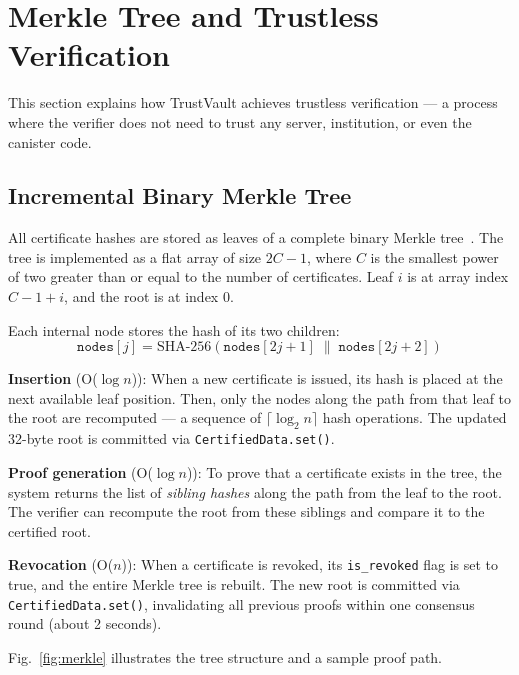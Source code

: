 \documentclass[conference]{IEEEtran}
\begin{document}
\section{Merkle Tree and Trustless Verification}
\label{sec:merkle}

This section explains how TrustVault achieves trustless verification — a process where the verifier does not need to trust any server, institution, or even the canister code.

\subsection{Incremental Binary Merkle Tree}

All certificate hashes are stored as leaves of a complete binary Merkle tree~\cite{merkle1989certified}. The tree is implemented as a flat array of size $2C - 1$, where $C$ is the smallest power of two greater than or equal to the number of certificates. Leaf $i$ is at array index $C - 1 + i$, and the root is at index 0.

Each internal node stores the hash of its two children:
\begin{equation}
  \texttt{nodes}[j] = \text{SHA-256}(\texttt{nodes}[2j+1] \;\|\; \texttt{nodes}[2j+2])
  \label{eq:merkle}
\end{equation}

\textbf{Insertion} (O($\log n$)): When a new certificate is issued, its hash is placed at the next available leaf position. Then, only the nodes along the path from that leaf to the root are recomputed — a sequence of $\lceil\log_2 n\rceil$ hash operations. The updated 32-byte root is committed via \texttt{CertifiedData.set()}.

\textbf{Proof generation} (O($\log n$)): To prove that a certificate exists in the tree, the system returns the list of \emph{sibling hashes} along the path from the leaf to the root. The verifier can recompute the root from these siblings and compare it to the certified root.

\textbf{Revocation} (O($n$)): When a certificate is revoked, its \texttt{is\_revoked} flag is set to true, and the entire Merkle tree is rebuilt. The new root is committed via \texttt{CertifiedData.set()}, invalidating all previous proofs within one consensus round (about 2 seconds).

Fig.~\ref{fig:merkle} illustrates the tree structure and a sample proof path.
\end{document}
